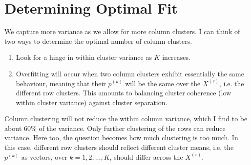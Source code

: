 \documentclass{article}
\begin{document}
\section{Determining Optimal Fit}

	We capture more variance as we allow for more column clusters.  I can think of two ways to determine the optimal number of column clusters.
\begin{enumerate}
\item Look for a hinge in within cluster variance as $K$ increases.    
\item Overfitting will occur when two column clusters exhibit essentially the same behaviour, meaning that their $p^{(k)}$ will be the same over the $X^{(r)}$, i.e. the different row clusters.  This amounts to balancing cluster coherence (low within cluster variance) against cluster separation.
\end{enumerate}

	Column clustering will not reduce the within column variance, which I find to be about $60\%$ of the variance.  Only further clustering of the rows can reduce variance.   Here too, the question becomes how much clustering is too much.  In this case, different row clusters should reflect different cluster means, i.e. the $p^{(k)}$ as vectors, over $k=1,2,\dots,K$, should differ across the $X^{(r)}$.  
\end{document}
